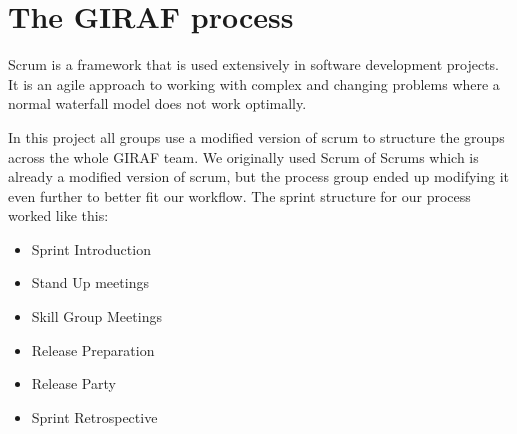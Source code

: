 \section{The GIRAF process}\label{the-giraf-process}
Scrum is a framework that is used extensively in software development projects.
It is an agile approach to working with complex and changing problems where a normal waterfall model does not work optimally.

In this project all groups use a modified version of scrum to structure the groups across the whole GIRAF team.
We originally used Scrum of Scrums which is already a modified version of scrum, but the process group ended up modifying it even further to better fit our workflow.
The sprint structure for our process worked like this:

\begin{itemize}
    \item Sprint Introduction
    \item Stand Up meetings
    \item Skill Group Meetings
    \item Release Preparation
    \item Release Party
    \item Sprint Retrospective
\end{itemize}

